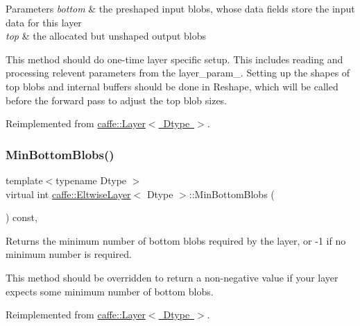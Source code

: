 \begin{DoxyParams}{Parameters}
{\em bottom} & the preshaped input blobs, whose data fields store the input data for this layer \\
\hline
{\em top} & the allocated but unshaped output blobs\\
\hline
\end{DoxyParams}
This method should do one-\/time layer specific setup. This includes reading and processing relevent parameters from the {\ttfamily layer\+\_\+param\+\_\+}. Setting up the shapes of top blobs and internal buffers should be done in {\ttfamily Reshape}, which will be called before the forward pass to adjust the top blob sizes. 

Reimplemented from \mbox{\hyperlink{classcaffe_1_1_layer_a481323a3e0972c682787f2137468c29f}{caffe\+::\+Layer$<$ Dtype $>$}}.

\mbox{\label{classcaffe_1_1_eltwise_layer_a802079d89e0f007c15b39e0c1fb0d275}} 
\subsubsection{\texorpdfstring{Min\+Bottom\+Blobs()}{MinBottomBlobs()}\hspace{0.1cm}{\footnotesize\ttfamily [1/2]}}
{\footnotesize\ttfamily template$<$typename Dtype $>$ \\
virtual int \mbox{\hyperlink{classcaffe_1_1_eltwise_layer}{caffe\+::\+Eltwise\+Layer}}$<$ Dtype $>$\+::Min\+Bottom\+Blobs (\begin{DoxyParamCaption}{ }\end{DoxyParamCaption}) const\hspace{0.3cm}{\ttfamily [inline]}, {\ttfamily [virtual]}}



Returns the minimum number of bottom blobs required by the layer, or -\/1 if no minimum number is required. 

This method should be overridden to return a non-\/negative value if your layer expects some minimum number of bottom blobs. 

Reimplemented from \mbox{\hyperlink{classcaffe_1_1_layer_aca3cb2bafaefda5d4760aaebd0b72def}{caffe\+::\+Layer$<$ Dtype $>$}}.

